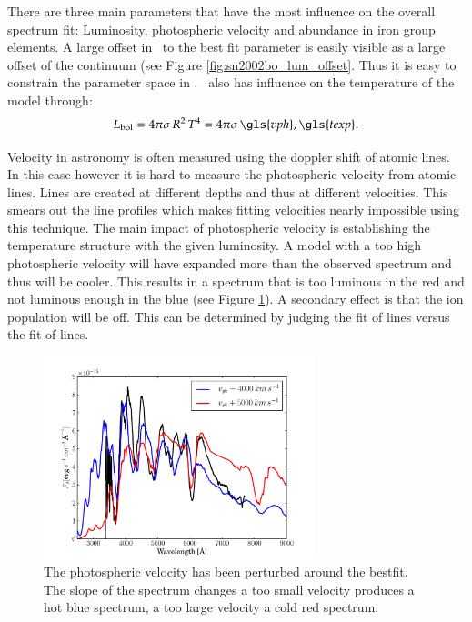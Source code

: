 There are three main parameters that have the most influence on the overall spectrum fit: Luminosity, photospheric velocity and abundance in iron group elements.
A large offset in \lum\ to the best fit parameter is easily visible as a large offset of the continuum (see Figure \ref{fig:sn2002bo_lum_offset}. Thus it is easy to constrain the parameter space in \lum. \lum\ also has influence on the temperature of the model through:
\[
L_{\rm bol} = 4\pi\sigma\, R^2\,T^4 = 4\pi\sigma\,\gls{vph},\gls{texp}.
\label{eq:lum_temp_relation}
\]

Velocity in astronomy is often measured using the doppler shift of atomic lines. In this case however it is hard to measure the photospheric velocity from atomic lines.  Lines are created at different depths and thus at different velocities. This smears out the line profiles which makes fitting velocities nearly impossible using this technique. The main impact of photospheric velocity is establishing the temperature structure with the given luminosity. A model with a too high photospheric velocity will have expanded more than the observed spectrum and thus will be cooler. This results in a spectrum that is too luminous in the red and not luminous enough in the blue (see Figure \ref{fig:sn2002bo_vph_offset}). 
A secondary effect is that the ion population will be off. This can be determined by judging the fit of  lines versus the fit of  lines. 
\begin{figure}[htbp] %
   \centering
   \includegraphics[width=0.7\textwidth]{chapter_dalek/plots/bf2002bo-10_vph.pdf} 
   \caption{The photospheric velocity has been perturbed around the bestfit. The slope of the spectrum changes a too small velocity produces a hot blue spectrum, a too large velocity a cold red spectrum.}
   \label{fig:sn2002bo_vph_offset}
\end{figure}


